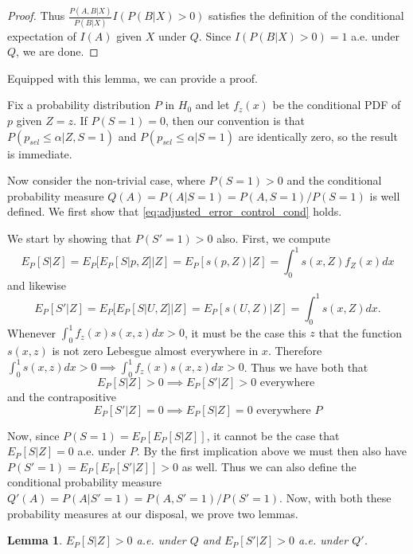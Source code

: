 \documentclass{article}
\newtheorem{lemma}{Lemma}
\begin{document}
\begin{appendix}
\begin{proof}
    Thus $\frac{P(A, B | X) }{ P(B | X) } I(P(B|X) > 0)$ satisfies the definition of the conditional expectation of $I(A)$ given $X$ under $Q$. Since $I(P(B|X) > 0) = 1$ a.e. under $Q$, we are done.  

\end{proof}

Equipped with this lemma, we can provide a proof. 

Fix a probability distribution $P$ in $H_0$ and let $f_z(x)$ be the conditional PDF of $p$ given $Z=z$. If $P(S=1) = 0$, then our convention is that $P(p_{sel} \leq \alpha | Z, S=1)$ and $P(p_{sel} \leq \alpha | S=1)$ are identically zero, so the result is immediate. 

Now consider the non-trivial case, where $P(S=1) > 0$ and the conditional probability measure $Q(A)= P(A | S=1) = P(A, S=1)/P(S=1)$ is well defined. We first show that \eqref{eq:adjusted_error_control_cond} holds. 

We start by showing that $P(S'=1) > 0$ also. First, we compute 
\begin{equation*}
    E_P[S | Z] = E_P[ E_P[S|p, Z]| Z] = E_P[s(p, Z)| Z] = \int_0^1  s(x, Z)f_Z(x) dx 
\end{equation*}
and likewise
\begin{equation*}
    E_P[S' | Z] = E_P[ E_P[S|U, Z]| Z] = E_P[s(U, Z)| Z] = \int_0^1 s(x, Z) dx. 
\end{equation*}
Whenever $\int_0^1 f_z(x) s(x, z) dx > 0$, it must be the case this $z$ that the function $s(x, z)$ is not zero Lebesgue almost everywhere in $x$. Therefore $\int_0^1 s(x, z) dx > 0 \implies \int_0^1 f_z(x) s(x, z) dx > 0 $. Thus we have both that 
\begin{equation*}
    E_P[S|Z] > 0 \implies E_P[S'| Z] > 0 \text{ everywhere } 
\end{equation*}
and the contrapositive
\begin{equation*}
    E_P[S'|Z] = 0 \implies E_P[S| Z] = 0 \text{ everywhere } P 
\end{equation*}

Now, since $P(S = 1) = E_P[E_P[S| Z]]$, it cannot be the case that $E_P[S|Z] = 0$ a.e. under $P$.  By the first implication above we must then also have $P(S' = 1) = E_P[E_P[S'| Z]] > 0$ as well. Thus we can also define the conditional probability measure $Q'(A) = P(A | S'=1) = P(A, S'=1)/P(S'=1)$. Now, with both these probability measures at our disposal, we prove two lemmas. 

\begin{lemma}
    \label{lem:pos_selection}
    $E_P[S|Z]> 0$ a.e. under $Q$ and $E_P[S'|Z] > 0$ a.e. under $Q'$.
\end{lemma}


\end{appendix}
\end{document}
